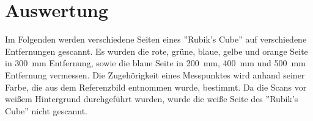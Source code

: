 \documentclass[ngerman,a4paper,parskip=half]{scrartcl}
\begin{document}


\section{Auswertung}
\label{sec:evaluation}

Im Folgenden werden verschiedene Seiten eines ''Rubik's Cube'' auf verschiedene Entfernungen gescannt. Es wurden die rote, grüne, blaue, gelbe und orange Seite in 300~mm Entfernung, sowie die blaue Seite in 200~mm, 400~mm und 500~mm Entfernung vermessen. Die Zugehörigkeit eines Messpunktes wird anhand seiner Farbe, die aus dem Referenzbild entnommen wurde, bestimmt. Da die Scans vor weißem Hintergrund durchgeführt wurden, wurde die weiße Seite des ''Rubik's Cube'' nicht gescannt.
\end{document}
